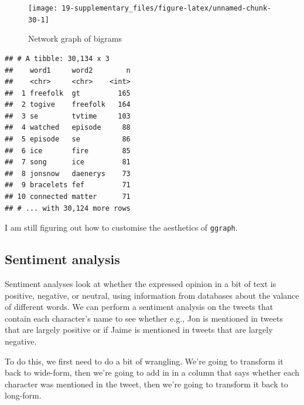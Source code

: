 \documentclass[]{book}
\begin{document}
\begin{figure}

{\centering \texttt{[image: 19-supplementary\_files/figure-latex/unnamed-chunk-30-1]} 

}

\caption{Network graph of bigrams}\label{fig:unnamed-chunk-30}
\end{figure}

\begin{verbatim}
## # A tibble: 30,134 x 3
##    word1     word2        n
##    <chr>     <chr>    <int>
##  1 freefolk  gt         165
##  2 togive    freefolk   164
##  3 se        tvtime     103
##  4 watched   episode     88
##  5 episode   se          86
##  6 ice       fire        85
##  7 song      ice         81
##  8 jonsnow   daenerys    73
##  9 bracelets fef         71
## 10 connected matter      71
## # ... with 30,124 more rows
\end{verbatim}

I am still figuring out how to customise the aesthetics of \texttt{ggraph}.

\hypertarget{sentiment-analysis}{%
\subsection{Sentiment analysis}\label{sentiment-analysis}}

Sentiment analyses look at whether the expressed opinion in a bit of text is positive, negative, or neutral, using information from databases about the valance of different words. We can perform a sentiment analysis on the tweets that contain each character's name to see whether e.g., Jon is mentioned in tweets that are largely positive or if Jaime is mentioned in tweets that are largely negative.

To do this, we first need to do a bit of wrangling. We're going to transform it back to wide-form, then we're going to add in in a column that says whether each character was mentioned in the tweet, then we're going to transform it back to long-form.
\end{document}
